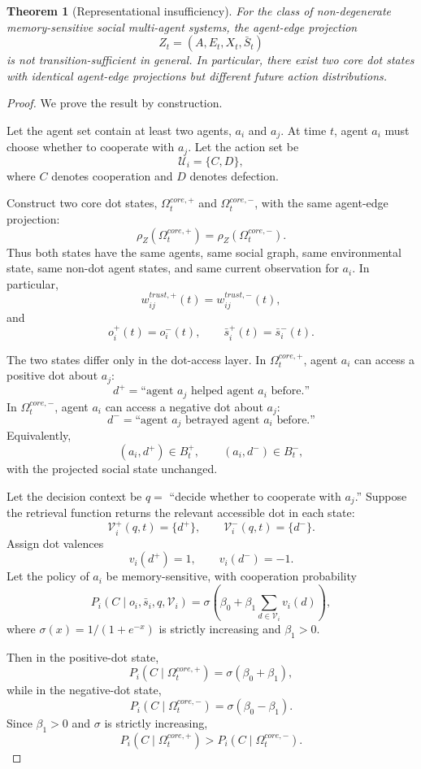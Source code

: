 \documentclass[11pt]{article}
\newtheorem{theorem}{Theorem}
\theoremstyle{remark}
\begin{document}
\begin{theorem}[Representational insufficiency]\label{thm:representational-insufficiency}
For the class of non-degenerate memory-sensitive social multi-agent systems, the agent-edge projection
$$
Z_t=(A,E_t,X_t,\bar S_t)
$$
is not transition-sufficient in general. In particular, there exist two core dot states with identical agent-edge projections but different future action distributions.
\end{theorem}

\begin{proof}
We prove the result by construction.

Let the agent set contain at least two agents, $a_i$ and $a_j$. At time $t$, agent $a_i$ must choose whether to cooperate with $a_j$. Let the action set be
$$
\mathcal{U}_i=\{C,D\},
$$
where $C$ denotes cooperation and $D$ denotes defection.

Construct two core dot states, $\Omega_t^{core,+}$ and $\Omega_t^{core,-}$, with the same agent-edge projection:
$$
\rho_Z(\Omega_t^{core,+})=\rho_Z(\Omega_t^{core,-}).
$$
Thus both states have the same agents, same social graph, same environmental state, same non-dot agent states, and same current observation for $a_i$. In particular,
$$
w_{ij}^{trust,+}(t)=w_{ij}^{trust,-}(t),
$$
and
$$
o_i^+(t)=o_i^-(t), \qquad \bar s_i^+(t)=\bar s_i^-(t).
$$

The two states differ only in the dot-access layer. In $\Omega_t^{core,+}$, agent $a_i$ can access a positive dot about $a_j$:
$$
d^+ = \text{``agent } a_j \text{ helped agent } a_i \text{ before.''}
$$
In $\Omega_t^{core,-}$, agent $a_i$ can access a negative dot about $a_j$:
$$
d^- = \text{``agent } a_j \text{ betrayed agent } a_i \text{ before.''}
$$
Equivalently,
$$
(a_i,d^+)\in B_t^+, \qquad (a_i,d^-)\in B_t^-,
$$
with the projected social state unchanged.

Let the decision context be $q=$ ``decide whether to cooperate with $a_j$.'' Suppose the retrieval function returns the relevant accessible dot in each state:
$$
\mathcal V_i^+(q,t)=\{d^+\}, \qquad \mathcal V_i^-(q,t)=\{d^-\}.
$$
Assign dot valences
$$
v_i(d^+)=1, \qquad v_i(d^-)=-1.
$$
Let the policy of $a_i$ be memory-sensitive, with cooperation probability
$$
P_i(C\mid o_i,\bar s_i,q,\mathcal V_i)=\sigma\left(\beta_0+\beta_1\sum_{d\in \mathcal V_i}v_i(d)\right),
$$
where $\sigma(x)=1/(1+e^{-x})$ is strictly increasing and $\beta_1>0$.

Then in the positive-dot state,
$$
P_i(C\mid \Omega_t^{core,+})=\sigma(\beta_0+\beta_1),
$$
while in the negative-dot state,
$$
P_i(C\mid \Omega_t^{core,-})=\sigma(\beta_0-\beta_1).
$$
Since $\beta_1>0$ and $\sigma$ is strictly increasing,
$$
P_i(C\mid \Omega_t^{core,+}) > P_i(C\mid \Omega_t^{core,-}).
$$


\end{proof}
\end{document}
